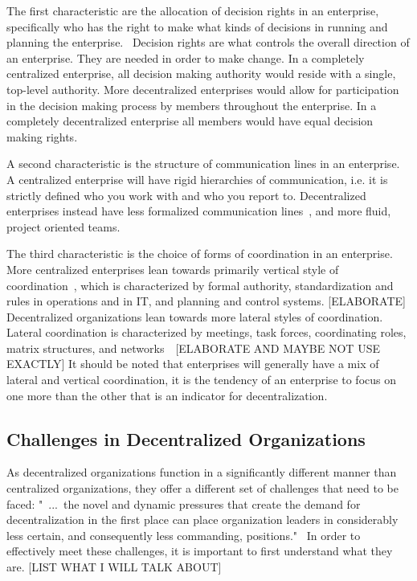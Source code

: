 The first characteristic are the allocation of decision rights in an enterprise, specifically who has the right to make what kinds of decisions in running and planning the enterprise.~\cite{pearlson2009} Decision rights are what controls the overall direction of an enterprise. They are needed in order to make change. In a completely centralized enterprise, all decision making authority would reside with a single, top-level authority. More decentralized enterprises would allow for participation in the decision making process by members throughout the enterprise. In a completely decentralized enterprise all members would have equal decision making rights. 

A second characteristic is the structure of communication lines in an enterprise. A centralized enterprise will have rigid hierarchies of communication, i.e. it is strictly defined who you work with and who you report to. Decentralized enterprises instead have less formalized communication lines~\cite{pearlson2009}, and more fluid, project oriented teams.~\cite{Applegate1988a}

The third characteristic is the choice of forms of coordination in an enterprise. More centralized enterprises lean towards primarily vertical style of coordination~\cite{Bolman2008}, which is characterized by formal authority, standardization and rules in operations and in IT, and planning and control systems. [ELABORATE] Decentralized organizations lean towards more lateral styles of coordination. Lateral coordination is characterized by meetings, task forces, coordinating roles, matrix structures, and networks~~\cite{Bolman2008}[ELABORATE AND MAYBE NOT USE EXACTLY] It should be noted that enterprises will generally have a mix of lateral and vertical coordination, it is the tendency of an enterprise to focus on one more than the other that is an indicator for decentralization. 

\subsection{Challenges in Decentralized Organizations}

As decentralized organizations function in a significantly different manner than centralized organizations, they offer a different set of challenges that need to be faced: "~...~the novel and dynamic pressures that create the demand for decentralization in the first place can place organization leaders in considerably less certain, and consequently less commanding, positions."~\cite{caruso2008boundaries} In order to effectively meet these challenges, it is important to first understand what they are. [LIST WHAT I WILL TALK ABOUT]

